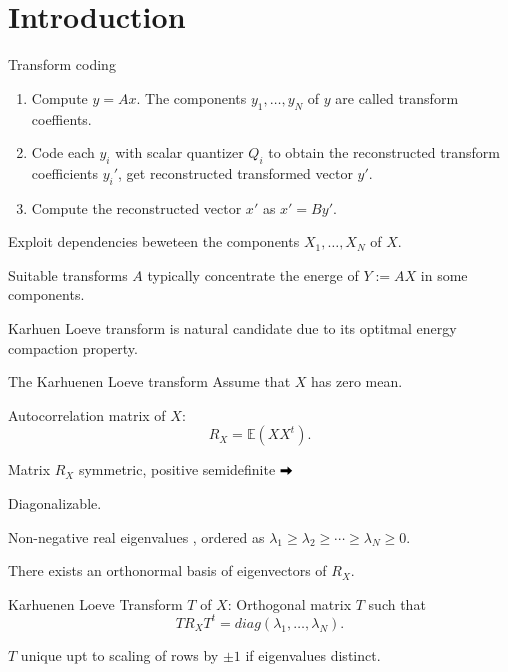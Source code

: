\section{Introduction}
\begin{frame}{Transform coding}
\begin{enumerate}
\item {} Compute $y=Ax$. The components $y_1,\dots,y_N$ of $y$ are called transform coeffients. 
\item {} Code each $y_i$ with scalar quantizer $Q_i$ to obtain the reconstructed transform coefficients $y_i'$, get  reconstructed transformed vector $y'$. 
\item {} Compute the reconstructed vector $x'$ as $x'=By'$.   
\end{enumerate}
\bit
\item Exploit dependencies beweteen the components $X_1,\dots,X_N$ of $X$. 
\item Suitable transforms $A$ typically concentrate the energe of $Y:=AX$ in some components. 
\item Karhuen Loeve transform is natural candidate due to its optitmal energy compaction property. 
\eit
\end{frame}
\begin{frame}{The Karhuenen Loeve transform}
Assume that $X$ has zero mean. 
\bit
\item Autocorrelation matrix of $X$: 
\[
R_X=\mathbb{E}(XX^t). 
\]
\item Matrix $R_X$ symmetric, positive semidefinite $\iarrow$ 
\bit
\item Diagonalizable.
\item Non-negative real eigenvalues , ordered as $\lambda_1\geq \lambda_2\geq\cdots\geq \lambda_N\geq 0$. 
\item There exists an orthonormal basis of eigenvectors of $R_X$.
\eit
\item Karhuenen Loeve Transform $T$ of $X$: Orthogonal matrix $T$ such 
that 
\[
TR_XT^t = diag(\lambda_1,\dots,\lambda_N).
\]
\item $T$ unique upt to scaling of rows by $\pm 1$ if eigenvalues distinct. 
\eit
\end{frame}

